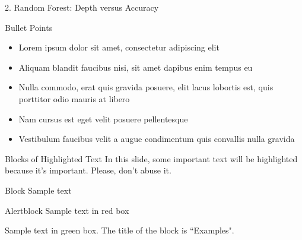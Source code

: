 \documentclass[aspectratio=169,xcolor=dvipsnames]{beamer}
\begin{document}
\begin{frame}{2. Random Forest: Depth versus Accuracy}


\end{frame}


\begin{frame}{Bullet Points}
    \begin{itemize}
        \item Lorem ipsum dolor sit amet, consectetur adipiscing elit
        \item Aliquam blandit faucibus nisi, sit amet dapibus enim tempus eu
        \item Nulla commodo, erat quis gravida posuere, elit lacus lobortis est, quis porttitor odio mauris at libero
        \item Nam cursus est eget velit posuere pellentesque
        \item Vestibulum faucibus velit a augue condimentum quis convallis nulla gravida
    \end{itemize}
\end{frame}


\begin{frame}{Blocks of Highlighted Text}
    In this slide, some important text will be \alert{highlighted} because it's important. Please, don't abuse it.

    \begin{block}{Block}
        Sample text
    \end{block}

    \begin{alertblock}{Alertblock}
        Sample text in red box
    \end{alertblock}

    \begin{examples}
        Sample text in green box. The title of the block is ``Examples".
    \end{examples}
\end{frame}

\end{document}

